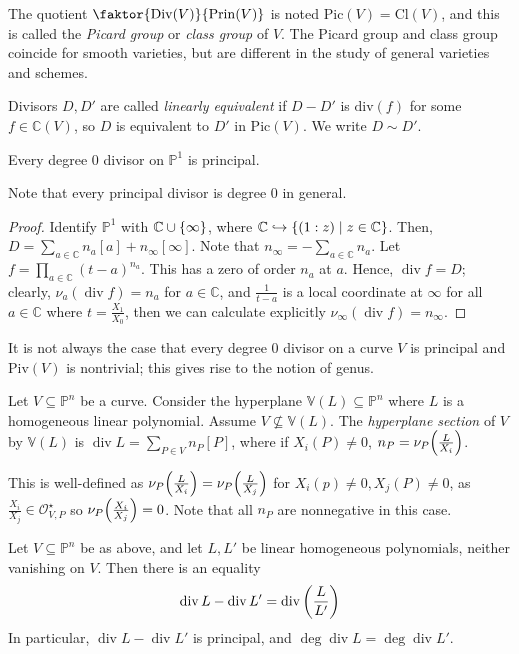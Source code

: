 The quotient \( \faktor{\mathrm{Div}(V)}{\mathrm{Prin}(V)} \) is noted \( \mathrm{Pic}(V) = \mathrm{Cl}(V) \), and this is called the \emph{Picard group} or \emph{class group} of \( V \).
The Picard group and class group coincide for smooth varieties, but are different in the study of general varieties and schemes.

Divisors \( D, D' \) are called \emph{linearly equivalent} if \( D - D' \) is \( \mathrm{div}(f) \) for some \( f \in \mathbb C(V) \), so \( D \) is equivalent to \( D' \) in \( \mathrm{Pic}(V) \).
We write \( D \sim D' \).
\begin{proposition}
    Every degree 0 divisor on \( \mathbb P^1 \) is principal.
\end{proposition}
Note that every principal divisor is degree 0 in general.
\begin{proof}
    Identify \( \mathbb P^1 \) with \( \mathbb C \cup \qty{\infty} \), where \( \mathbb C \hookrightarrow \qty{(1:z) \mid z \in \mathbb C} \).
    Then, \( D = \sum_{a \in \mathbb C} n_a [a] + n_\infty [\infty] \).
    Note that \( n_\infty = -\sum_{a \in \mathbb C} n_a \).
    Let \( f = \prod_{a \in \mathbb C} (t-a)^{n_a} \).
    This has a zero of order \( n_a \) at \( a \).
    Hence, \( \operatorname{div} f = D \); clearly, \( \nu_a(\operatorname{div} f) = n_a \) for \( a \in \mathbb C \), and \( \frac{1}{t-a} \) is a local coordinate at \( \infty \) for all \( a \in \mathbb C \) where \( t = \frac{X_1}{X_0} \), then we can calculate explicitly \( \nu_\infty(\operatorname{div} f) = n_\infty \).
\end{proof}
It is not always the case that every degree 0 divisor on a curve \( V \) is principal and \( \mathrm{Piv}(V) \) is nontrivial; this gives rise to the notion of genus.
\begin{definition}
    Let \( V \subseteq \mathbb P^n \) be a curve.
    Consider the hyperplane \( \mathbb V(L) \subseteq \mathbb P^n \) where \( L \) is a homogeneous linear polynomial.
    Assume \( V \not\subseteq \mathbb V(L) \).
    The \emph{hyperplane section} of \( V \) by \( \mathbb V(L) \) is \( \operatorname{div}L = \sum_{P \in V} n_P [P] \), where if \( X_i(P) \neq 0 \), \( n_P = \nu_P\qty(\frac{L}{X_i}) \).
\end{definition}
This is well-defined as \( \nu_P\qty(\frac{L}{X_i}) = \nu_P\qty(\frac{L}{X_j}) \) for \( X_i(p) \neq 0, X_j(P) \neq 0 \), as \( \frac{X_i}{X_j} \in \mathcal O_{V,P}^\star \) so \( \nu_P\qty(\frac{X_i}{X_j}) = 0 \).
Note that all \( n_P \) are nonnegative in this case.
\begin{proposition}
    Let \( V \subseteq \mathbb P^n \) be as above, and let \( L, L' \) be linear homogeneous polynomials, neither vanishing on \( V \).
    Then there is an equality
    \[ \operatorname{div}L - \operatorname{div}L' = \operatorname{div}\qty(\frac{L}{L'}) \]
    In particular, \( \operatorname{div}L - \operatorname{div}L' \) is principal, and \( \deg \operatorname{div}L = \deg \operatorname{div}L' \).
\end{proposition}
